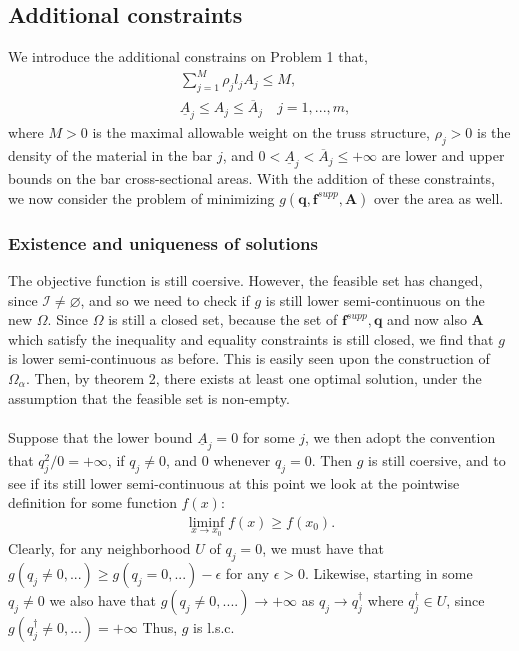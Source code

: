\documentclass[10pt,a4paper]{article}
\begin{document}
\subsection{Additional constraints}
We introduce the additional constrains on Problem 1 that,
\begin{align}
\label{problem2}
&\sum_{j=1}^M \rho_j l_j A_j \leq M,\\
\label{problem2A}
&\underline{A}_j \leq A_j \leq \overline{A}_j \quad j=1,...,m,
\end{align}
where $M > 0$ is the maximal allowable weight on the truss structure, $\rho_j > 0$ is the density of the material in the bar $j$, and $0 < \underline{A}_j <\overline{A}_j \leq +\infty$ are lower and upper bounds on the bar cross-sectional areas. With the addition of these constraints, we now consider the problem of minimizing $g(\boldsymbol{q},\boldsymbol{f}^{supp},\boldsymbol{A})$ over the area as well.
\subsubsection{Existence and uniqueness of solutions}
The objective function is still coersive. However, the feasible set has changed, since $\mathcal{I} \neq \varnothing$, and so we need to check if $g$ is still lower semi-continuous on the new $\Omega$. Since $\Omega$ is still a closed set, because the set of $\boldsymbol{f}^{supp},\boldsymbol{q}$ and now also $\boldsymbol{A}$ which satisfy the inequality and equality constraints is still closed, we find that $g$ is lower semi-continuous as before. This is easily seen upon the construction of $\Omega_\alpha$. Then, by theorem 2, there exists at least one optimal solution, under the assumption that the feasible set is non-empty.
\\\\
Suppose that the lower bound $\underline{A}_j=0$ for some $j$, we then adopt the convention that $q_j^2/0 = +\infty$, if $q_j\neq0$, and $0$ whenever $q_j=0$. Then $g$ is still coersive, and to see if its still lower semi-continuous at this point we look at the pointwise definition for some function $f(x)$:
\begin{align}
\liminf_{x \rightarrow x_0} f(x) \geq f(x_0).
\end{align}
Clearly, for any neighborhood $U$ of $q_j = 0$, we must have that $g(q_j\neq0,...) \geq g(q_j = 0,...) - \epsilon$ for any $\epsilon > 0$. Likewise, starting in some $q_j \neq 0$ we also have that $g(q_j\neq0,....) \rightarrow +\infty$ as $q_j \rightarrow q_j^\dagger$ where $q_j^\dagger\in U$, since $g(q_j^\dagger \neq 0,...)=+\infty$ Thus, $g$ is l.s.c.
\end{document}
